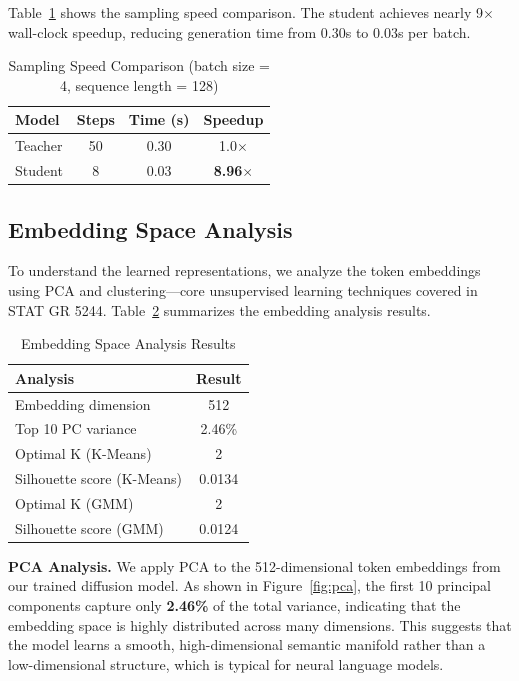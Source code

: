\documentclass[conference]{IEEEtran}
\begin{document}
Table~\ref{tab:speed} shows the sampling speed comparison. The student achieves nearly 9$\times$ wall-clock speedup, reducing generation time from 0.30s to 0.03s per batch.

\begin{table}[t]
\centering
\caption{Sampling Speed Comparison (batch size = 4, sequence length = 128)}
\label{tab:speed}
\begin{tabular}{lccc}
\toprule
\textbf{Model} & \textbf{Steps} & \textbf{Time (s)} & \textbf{Speedup} \\
\midrule
Teacher & 50 & 0.30 & 1.0$\times$ \\
Student & 8 & 0.03 & \textbf{8.96$\times$} \\
\bottomrule
\end{tabular}
\end{table}

\subsection{Embedding Space Analysis}

To understand the learned representations, we analyze the token embeddings using PCA and clustering---core unsupervised learning techniques covered in STAT GR 5244. Table~\ref{tab:embedding_analysis} summarizes the embedding analysis results.

\begin{table}[h]
\centering
\caption{Embedding Space Analysis Results}
\label{tab:embedding_analysis}
\begin{tabular}{lc}
\toprule
\textbf{Analysis} & \textbf{Result} \\
\midrule
Embedding dimension & 512 \\
Top 10 PC variance & 2.46\% \\
Optimal K (K-Means) & 2 \\
Silhouette score (K-Means) & 0.0134 \\
Optimal K (GMM) & 2 \\
Silhouette score (GMM) & 0.0124 \\
\bottomrule
\end{tabular}
\end{table}

\textbf{PCA Analysis.} We apply PCA to the 512-dimensional token embeddings from our trained diffusion model. As shown in Figure~\ref{fig:pca}, the first 10 principal components capture only \textbf{2.46\%} of the total variance, indicating that the embedding space is highly distributed across many dimensions. This suggests that the model learns a smooth, high-dimensional semantic manifold rather than a low-dimensional structure, which is typical for neural language models.
\end{document}
